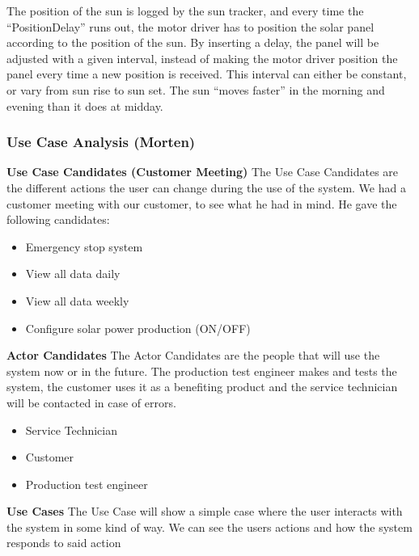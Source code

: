 \documentclass[12pt,a4paper]{report}
\begin{document}
The position of the sun is logged by the sun tracker, and every time the “PositionDelay” runs out, the motor driver has to position the solar panel according to the position of the sun. By inserting a delay, the panel will be adjusted with a given interval, instead of making the motor driver position the panel every time a new position is received. This interval can either be constant, or vary from sun rise to sun set. The sun “moves faster” in the morning and evening than it does at midday.

\subsubsection{Use Case Analysis (Morten)}
\textbf{Use Case Candidates (Customer Meeting)}
The Use Case Candidates are the different actions the user can change during the use of the system. We had a customer meeting with our customer, to see what he had in mind. He gave the following candidates:

\begin{itemize}
\item Emergency stop system
\item View all data daily
\item View all data weekly
\item Configure solar power production (ON/OFF)
\end{itemize}

\textbf{Actor Candidates}
The Actor Candidates are the people that will use the system now or in the future. The production test engineer makes and tests the system, the customer uses it as a benefiting product and the service technician will be contacted in case of errors.

\begin{itemize}
\item Service Technician 
\item Customer
\item Production test engineer
\end{itemize}

\textbf{Use Cases}
The Use Case will show a simple case where the user interacts with the system in some kind of way. We can see the users actions and how the system responds to said action
\end{document}
